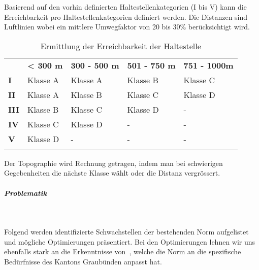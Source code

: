 Basierend auf den vorhin definierten Haltestellenkategorien (I bis V) kann die Erreichbarkeit pro Haltestellenkategorien definiert werden.
Die Distanzen sind Luftlinien wobei ein mittlere Umwegfaktor von 20 bis 30\% berücksichtigt wird.

\begin{longtable}[c]{l p{3.3cm} p{3.3cm} p{3.3cm} p{3.3cm}}
        \midrule
        \textbf{}
                                & \textbf{< 300 m}
                                & \textbf{300 - 500 m}
                                & \textbf{501 - 750 m}
                                & \textbf{751 - 1000m}\\
        \textbf{I}
                                & Klasse A
                                & Klasse A
                                & Klasse B
                                & Klasse C\\
        \textbf{II}
                                & Klasse A
                                & Klasse B
                                & Klasse C
                                & Klasse D\\
        \textbf{III}
                                & Klasse B
                                & Klasse C
                                & Klasse D
                                & -\\
        \textbf{IV}
                                & Klasse C
                                & Klasse D
                                & -
                                & -\\
        \textbf{V}
                                & Klasse D
                                & -
                                & -
                                & -\\
        \bottomrule
    \caption{Ermittlung der Erreichbarkeit der Haltestelle}
    \label{table:Ermittlung Erreichbarkeit der Haltestelle}
\end{longtable}

Der Topographie wird Rechnung getragen, indem man bei schwierigen Gegebenheiten die nächste Klasse wählt oder die Distanz vergrössert.

\subparagraph{Problematik}~\\
\label{Definition ÖV-Güteklassen:Problematik}

Folgend werden identifizierte Schwachstellen der bestehenden Norm aufgelistet und mögliche Optimierungen präsentiert.
Bei den Optimierungen lehnen wir uns ebenfalls stark an die Erkenntnisse von~\cite{oev-guteklasse-gr}, welche die Norm an die spezifische Bedürfnisse des Kantons Graubünden anpasst hat.

